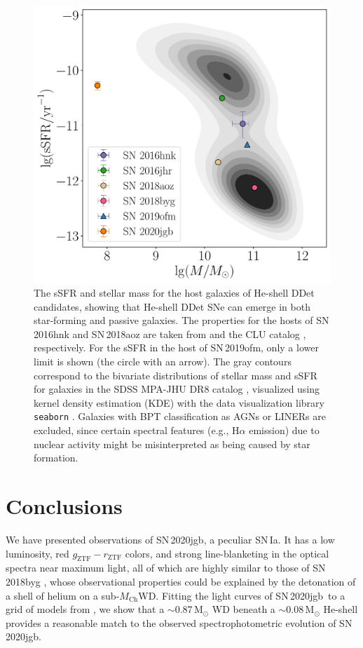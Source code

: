 \documentclass[twocolumn]{aastex631}
\newcommand{\sn}{SN\,2020jgb}
\newcommand{\Mch}{$M_\mathrm{Ch}$}
\begin{document}
\begin{CJK*}{UTF8}{gbsn}
\begin{figure}
    \centering
    \includegraphics[width=\linewidth]{host.pdf}
    \caption{The sSFR and stellar mass for the host galaxies of He-shell DDet candidates, showing that He-shell DDet SNe can emerge in both star-forming and passive galaxies. The properties for the hosts of SN\,2016hnk and SN\,2018aoz are taken from \citet{Dong_Ca-rich_2022} and the CLU catalog \citep{Cook_2019, de_Ca_rich_2020}, respectively. For the sSFR in the host of SN\,2019ofm, only a lower limit is shown (the circle with an arrow). The gray contours correspond to the bivariate distributions of stellar mass and sSFR for galaxies in the SDSS MPA-JHU DR8 catalog \citep{Kauffmann_SDSS_2003,Brinchmann_SDSS_2004}, visualized using kernel density estimation (KDE) with the data visualization library \texttt{seaborn} \citep{Waskom_seaborn_2021}. Galaxies with BPT classification as AGNs or LINERs are excluded, since certain spectral features (e.g., H$\alpha$ emission) due to nuclear activity might be misinterpreted as being caused by star formation.}
    \label{fig:host}
\end{figure}

\section{Conclusions} \label{sec:conclusion}
We have presented observations of \sn, a peculiar SN\,Ia. It has a low luminosity, red $g_\mathrm{ZTF}-r_\mathrm{ZTF}$ colors, and strong line-blanketing in the optical spectra near maximum light, all of which are highly similar to those of SN\,2018byg \citep{de_18byg_2019}, whose observational properties could be explained by the detonation of a shell of helium on a sub-\Mch WD. Fitting the light curves of \sn\ to a grid of models from \citet{polin_observational_2019}, we show that a $\sim$0.87\,$\mathrm{M_\odot}$ WD beneath a $\sim$0.08\,$\mathrm{M_\odot}$ He-shell provides a reasonable match to the observed spectrophotometric evolution of \sn.


\end{CJK*}
\end{document}
